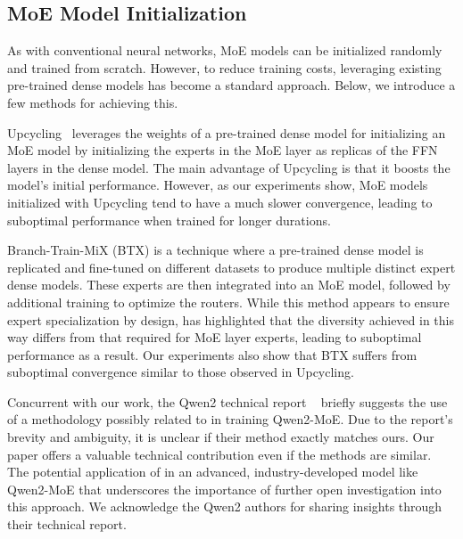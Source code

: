 \subsection{MoE Model Initialization}
As with conventional neural networks, MoE models can be initialized randomly and trained from scratch. However, to reduce training costs, leveraging existing pre-trained dense models has become a standard approach. Below, we introduce a few methods for achieving this.


Upcycling~\citep{komatsuzaki2023sparse} leverages the weights of a pre-trained dense model for initializing an MoE model by initializing the experts in the MoE layer as replicas of the FFN layers in the dense model.
The main advantage of Upcycling is that it boosts the model's initial performance.  However, as our experiments show, MoE models initialized with Upcycling tend to have a much slower convergence, leading to suboptimal performance when trained for longer durations.



Branch-Train-MiX (BTX) \citep{sukhbaatar2024branchtrainmix} is a technique where a pre-trained dense model is replicated and fine-tuned on different datasets to produce multiple distinct expert dense models. These experts are then integrated into an MoE model, followed by additional training to optimize the routers. While this method appears to ensure expert specialization by design, \cite{jiang2024mixtralexperts} has highlighted that the diversity achieved in this way differs from that required for MoE layer experts, leading to suboptimal performance as a result. Our experiments also show that BTX suffers from suboptimal convergence similar to those observed in Upcycling.






Concurrent with our work, the Qwen2 technical report ~\citep{yang2024qwen2technicalreport} briefly suggests the use of a methodology possibly related to \methodname{} in training Qwen2-MoE. Due to the report's brevity and ambiguity, it is unclear if their method exactly matches ours. 
Our paper offers a valuable technical contribution even if the methods are similar. 
The potential application of \methodname{} in an advanced, industry-developed model like Qwen2-MoE that underscores the importance of further open investigation into this approach. We acknowledge the Qwen2 authors for sharing insights through their technical report.